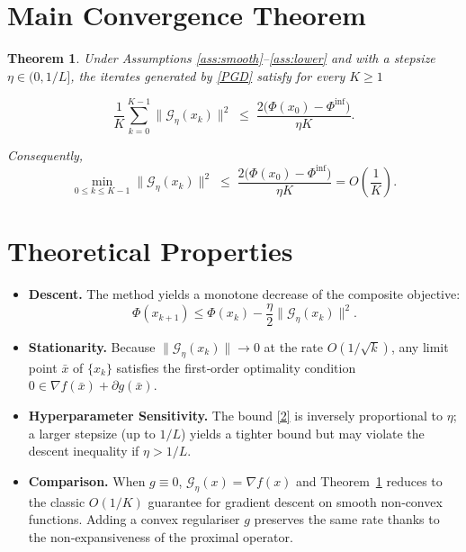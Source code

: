 \documentclass{article}
\newtheorem{theorem}{Theorem}
\begin{document}
\section*{Main Convergence Theorem}
\begin{theorem}\label{thm:main}
Under Assumptions \ref{ass:smooth}–\ref{ass:lower} and with a stepsize $\eta\in(0,1/L]$, the iterates generated by \eqref{PGD} satisfy for every $K\ge 1$  

\[
\frac{1}{K}\sum_{k=0}^{K-1}\|\mathcal{G}_{\eta}(x_k)\|^{2}
\;\le\;
\frac{2\big(\Phi(x_0)-\Phi^{\inf}\big)}{\eta K}.
\tag{2}
\]

Consequently,
\[
\min_{0\le k\le K-1}\|\mathcal{G}_{\eta}(x_k)\|^{2}
\;\le\;
\frac{2\big(\Phi(x_0)-\Phi^{\inf}\big)}{\eta K}
=O\!\left(\frac{1}{K}\right).
\]
\end{theorem}

\section*{Theoretical Properties}
\begin{itemize}[noitemsep]
    \item \textbf{Descent.} The method yields a monotone decrease of the composite objective:
          \[
          \Phi(x_{k+1})\le \Phi(x_k)-\frac{\eta}{2}\|\mathcal{G}_{\eta}(x_k)\|^{2}.
          \tag{3}
          \]
    \item \textbf{Stationarity.} Because $\|\mathcal{G}_{\eta}(x_k)\|\to 0$ at the rate $O(1/\sqrt{k})$, any limit point $\bar x$ of $\{x_k\}$ satisfies the first‑order optimality condition 
          $0\in\nabla f(\bar x)+\partial g(\bar x)$.
    \item \textbf{Hyperparameter Sensitivity.} The bound \eqref{2} is inversely proportional to $\eta$; a larger stepsize (up to $1/L$) yields a tighter bound but may violate the descent inequality if $\eta>1/L$.
    \item \textbf{Comparison.} When $g\equiv0$, $\mathcal{G}_{\eta}(x)=\nabla f(x)$ and Theorem~\ref{thm:main} reduces to the classic $O(1/K)$ guarantee for gradient descent on smooth non‑convex functions. Adding a convex regulariser $g$ preserves the same rate thanks to the non‑expansiveness of the proximal operator.
\end{itemize}
\end{document}
